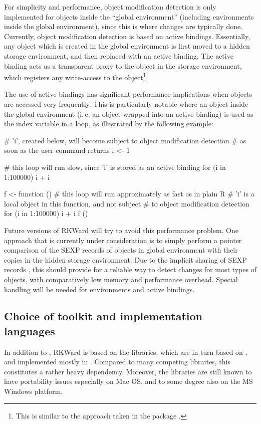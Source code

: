For simplicity and performance, object modification detection is only
implemented for objects inside the ``global environment'' (including environments
inside the global environment), since this is where changes are typically done.
Currently, object modification detection is based on active bindings.
Essentially, any object which is created in the global environment is first
moved to a hidden storage environment, and then replaced with an active binding.
The active binding acts as a transparent proxy to the object in the storage
environment, which registers any write-access to the object\footnote{
    This is similar to the approach taken in the  package \citep{Plate2009}.
}.

The use of active bindings has significant performance implications when
objects are accessed very frequently. This is particularly notable where an
object inside the global environment (i.\,e. an object wrapped into an active
binding) is used as the index variable in a loop, as illustrated by the
following example:

\begin{Code}
# 'i', created below, will become subject to object modification detection
# as soon as the user command returns
i <- 1

# this loop will run slow, since 'i' is stored as an active binding
for (i in 1:100000) i + i

f <- function () {
    # this loop will run approximately as fast as in plain R
    # 'i' is a local object in this function, and not subject
    # to object modification detection
    for (i in 1:100000) i + i
}
f ()
\end{Code}

Future versions of RKWard will try to avoid this performance problem. 
One approach that is currently under consideration is to simply perform
a pointer comparison of the SEXP records of objects in global environment with
their copies in the hidden storage environment. Due to the implicit sharing of
SEXP records \citep{RDCT2010a, RDCT2010b}, this should provide for a reliable
way to detect changes for most types of  objects, with comparatively low memory
and performance overhead. Special handling will be needed for environments and
active bindings.

\subsection{Choice of toolkit and implementation languages}
\label{sec:technical_toolkit}
In addition to , RKWard is based on the  libraries, which are in turn based
on , and implemented mostly in . Compared to many competing libraries,
this constitutes a rather heavy dependency. Moreover, the  libraries are
still known to have portability issues especially on Mac OS, and to some degree
also on the MS Windows platform.

